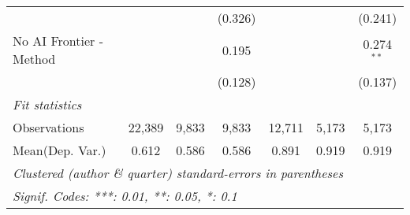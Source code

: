 \begin{tabular}{lcccccc}
                           &               &               & (0.326)      &               &               & (0.241)\\   
   No AI Frontier - Method &               &               & 0.195        &               &               & 0.274$^{**}$\\   
                           &               &               & (0.128)      &               &               & (0.137)\\   
   \midrule
   \emph{Fit statistics}\\
   Observations            & 22,389        & 9,833         & 9,833        & 12,711        & 5,173         & 5,173\\  
Mean(Dep. Var.) & 0.612 & 0.586 & 0.586 & 0.891 & 0.919 & 0.919 \\
   \midrule \midrule
   \multicolumn{7}{l}{\emph{Clustered (author \& quarter) standard-errors in parentheses}}\\
   \multicolumn{7}{l}{\emph{Signif. Codes: ***: 0.01, **: 0.05, *: 0.1}}\\
\end{tabular}
\par\endgroup
